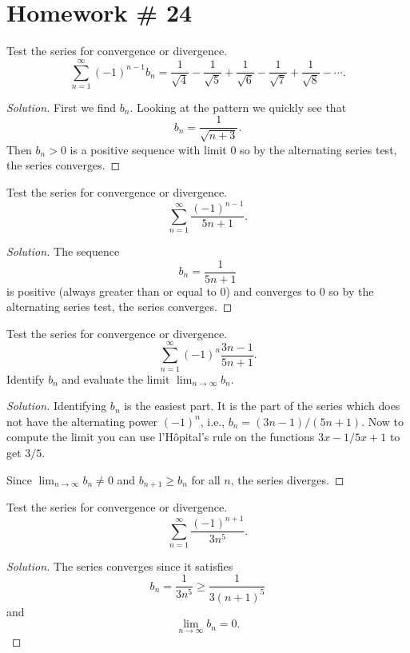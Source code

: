 \section{Homework \# 24}
\begin{problem}[WebAssign HW \# 24, \# 1]
Test the series for convergence or divergence.
\[
\sum_{n=1}^\infty(-1)^{n-1}b_n=\frac{1}{\sqrt{4}}-\frac{1}{\sqrt{5}}+\frac{1}{\sqrt{6}}-\frac{1}{\sqrt{7}}+\frac{1}{\sqrt{8}}-\cdots.
\]
\end{problem}
\begin{proof}[Solution]
First we find $b_n$. Looking at the pattern we quickly see that
\[
b_n=\frac{1}{\sqrt{n+3}}.
\]
Then $b_n>0$ is a positive sequence with limit $0$ so by the alternating
series test, the series converges.
\end{proof}

\begin{problem}[WebAssign HW \# 24, \# 2]
Test the series for convergence or divergence.
\[
\sum_{n=1}^\infty\frac{(-1)^{n-1}}{5n+1}.
\]
\end{problem}
\begin{proof}[Solution]
The sequence
\[
b_n=\frac{1}{5n+1}
\]
is positive (always greater than or equal to $0$) and converges to $0$ so
by the alternating series test, the series converges.
\end{proof}

\begin{problem}[WebAssign HW \# 24, \# 3]
Test the series for convergence or divergence.
\[
\sum_{n=1}^\infty (-1)^n\frac{3n-1}{5n+1}.
\]
Identify $b_n$ and evaluate the limit $\lim_{n\to\infty}b_n$.
\end{problem}
\begin{proof}[Solution]
Identifying $b_n$ is the easiest part. It is the part of the series which
does not have the alternating power $(-1)^n$, i.e.,
$b_n=(3n-1)/(5n+1)$. Now to compute the limit you can use l'Hôpital's rule
on the functions $3x-1/5x+1$ to get $3/5$.

Since $\lim_{n\to\infty}b_n\neq 0$ and $b_{n+1}\geq b_n$ for all $n$, the
series diverges.
\end{proof}

\begin{problem}[WebAssign HW \# 24, \# 4]
Test the series for convergence or divergence.
\[
\sum_{n=1}^\infty\frac{(-1)^{n+1}}{3n^5}.
\]
\end{problem}
\begin{proof}[Solution]
The series converges since it satisfies
\[
b_n=\frac{1}{3n^5}\geq \frac{1}{3(n+1)^{5}}
\]
and
\[
\lim_{n\to\infty} b_n=0.
\]
\end{proof}

